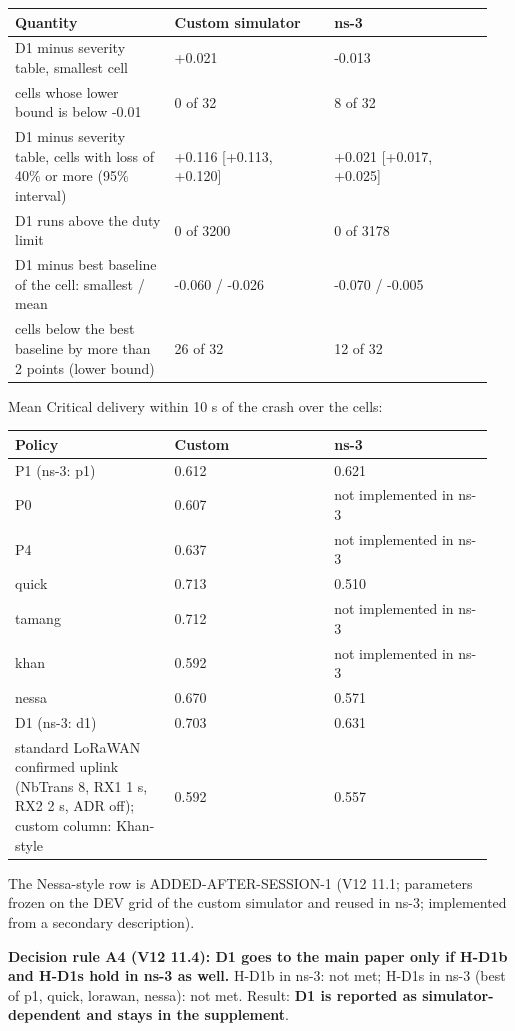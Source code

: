 {\scriptsize\raggedright
\begin{longtable}{p{0.317\linewidth}p{0.317\linewidth}p{0.317\linewidth}}
\toprule
Quantity & Custom simulator & ns-3 \\
\midrule
\endhead
D1 minus severity table, smallest cell & +0.021 & -0.013 \\
cells whose lower bound is below -0.01 & 0 of 32 & 8 of 32 \\
D1 minus severity table, cells with loss of 40\% or more (95\% interval) & +0.116 [+0.113, +0.120] & +0.021 [+0.017, +0.025] \\
D1 runs above the duty limit & 0 of 3200 & 0 of 3178 \\
D1 minus best baseline of the cell: smallest / mean & -0.060 / -0.026 & -0.070 / -0.005 \\
cells below the best baseline by more than 2 points (lower bound) & 26 of 32 & 12 of 32 \\
\bottomrule
\end{longtable}}

Mean Critical delivery within 10 s of the crash over the cells:

{\scriptsize\raggedright
\begin{longtable}{p{0.317\linewidth}p{0.317\linewidth}p{0.317\linewidth}}
\toprule
Policy & Custom & ns-3 \\
\midrule
\endhead
P1 (ns-3: p1) & 0.612 & 0.621 \\
P0 & 0.607 & not implemented in ns-3 \\
P4 & 0.637 & not implemented in ns-3 \\
quick & 0.713 & 0.510 \\
tamang & 0.712 & not implemented in ns-3 \\
khan & 0.592 & not implemented in ns-3 \\
nessa & 0.670 & 0.571 \\
D1 (ns-3: d1) & 0.703 & 0.631 \\
standard LoRaWAN confirmed uplink (NbTrans 8, RX1 1 s, RX2 2 s, ADR off); custom column: Khan-style & 0.592 & 0.557 \\
\bottomrule
\end{longtable}}

The Nessa-style row is ADDED-AFTER-SESSION-1 (V12 11.1; parameters frozen on the DEV grid of the custom simulator and reused in ns-3; implemented from a secondary description).

\textbf{Decision rule A4 (V12 11.4): D1 goes to the main paper only if H-D1b and H-D1s hold in ns-3 as well.} H-D1b in ns-3: not met; H-D1s in ns-3 (best of p1, quick, lorawan, nessa): not met. Result: \textbf{D1 is reported as simulator-dependent and stays in the supplement}.

